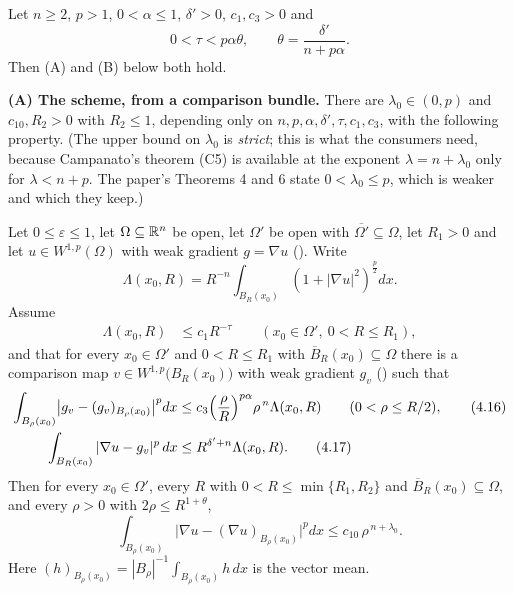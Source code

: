 \begin{helper}
Let $n\ge2$, $p>1$, $0<\alpha\le1$, $\delta'>0$, $c_1,c_3>0$ and
\[
0<\tau<p\alpha\theta,\qquad \theta=\frac{\delta'}{n+p\alpha} .
\]
Then (A) and (B) below both hold.

\medskip
\noindent\textbf{(A) The scheme, from a comparison bundle.}  There are
$\lambda_0\in(0,p)$ and $c_{10},R_2>0$ with $R_2\le1$, depending only on
$n,p,\alpha,\delta',\tau,c_1,c_3$, with the following property.  (The
upper bound on $\lambda_0$ is \emph{strict}; this is what the consumers need,
because Campanato's theorem (C5) is available at the exponent
$\lambda=n+\lambda_0$ only for $\lambda<n+p$.  The paper's Theorems 4 and 6
state $0<\lambda_0\le p$, which is weaker and which they keep.)

Let $0\le\varepsilon\le1$, let $\Omega\subseteq\mathbb{R}^n$ be open, let $\Omega'$ be
open with $\overline{\Omega'}\subseteq\Omega$, let $R_1>0$ and let
$u\in W^{1,p}(\Omega)$ with weak gradient $g=\nabla u$ ().
Write
\[
\Lambda(x_0,R)=R^{-n}\int_{B_R(x_0)}(1+|\nabla u|^2)^{\frac p2}dx .
\]
Assume
\begin{align}
\Lambda(x_0,R)&\le c_1R^{-\tau}\qquad (x_0\in\Omega',\ 0<R\le R_1),\tag{4.15}
\end{align}
and that for every $x_0\in\Omega'$ and $0<R\le R_1$ with
$\overline B_R(x_0)\subseteq\Omega$ there is a comparison map
$v\in W^{1,p}\bigl(B_R(x_0)\bigr)$ with weak gradient $g_v$
() such that
\begin{align}
\int_{B_\rho(x_0)}\bigl|g_v-(g_v)_{B_\rho(x_0)}\bigr|^p dx
&\le c_3\Bigl(\frac\rho R\Bigr)^{p\alpha}\rho^{\,n}\Lambda(x_0,R)
\qquad(0<\rho\le R/2),\tag{4.16}\\
\int_{B_R(x_0)}|\nabla u-g_v|^p\,dx&\le R^{\delta'+n}\Lambda(x_0,R).\tag{4.17}
\end{align}
Then for every $x_0\in\Omega'$, every $R$ with $0<R\le\min\{R_1,R_2\}$ and
$\overline B_R(x_0)\subseteq\Omega$, and every $\rho>0$ with
$2\rho\le R^{1+\theta}$,
\[
\int_{B_\rho(x_0)}\bigl|\nabla u-(\nabla u)_{B_\rho(x_0)}\bigr|^p dx
\le c_{10}\,\rho^{\,n+\lambda_0}.
\tag{4.19}
\]
Here $(h)_{B_\rho(x_0)}=|B_\rho|^{-1}\int_{B_\rho(x_0)}h\,dx$ is the vector mean.


\end{helper}
